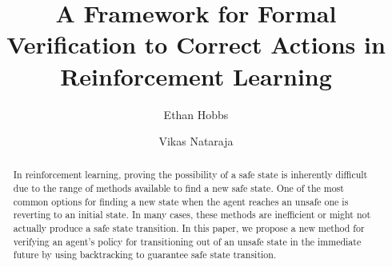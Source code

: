 \documentclass[acmsmall,review,authorversion]{acmart}
\begin{document}
\title{A Framework for Formal Verification to Correct Actions in Reinforcement Learning}

\author{Ethan Hobbs}
\author{Vikas Nataraja}



\begin{abstract}
In reinforcement learning, proving the possibility of a safe state is inherently difficult due to the range of methods available to find a new safe state. One of the most common options for finding a new state when the agent reaches an unsafe one is reverting to an initial state. In many cases, these methods are inefficient or might not actually produce a safe state transition. In this paper, we propose a new method for verifying an agent's policy for transitioning out of an unsafe state in the immediate future by using backtracking to guarantee safe state transition.
\end{abstract}

\maketitle
\end{document}
